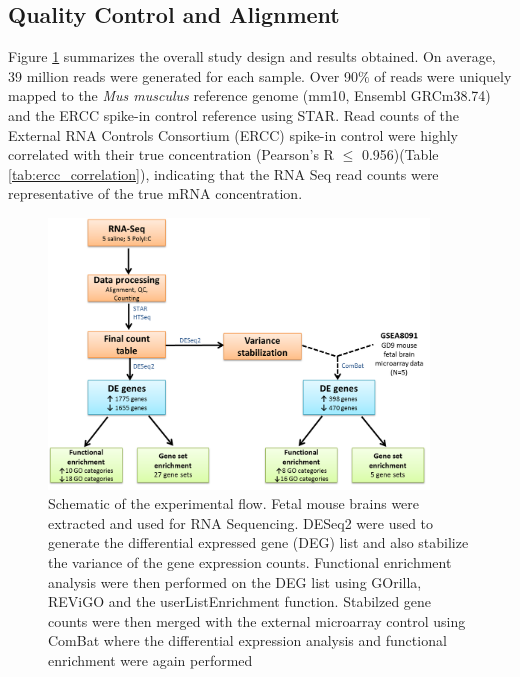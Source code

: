 \subsection{Quality Control and Alignment}
Figure \ref{fig:schematicMIA} summarizes the overall study design and results obtained.
On average, 39 million reads were generated for each sample. 
Over 90$\%$ of reads were uniquely mapped to the \textit{Mus musculus} reference genome (mm10, Ensembl GRCm38.74) and the ERCC spike-in control reference using STAR\cite{Dobin2013}. 
Read counts of the External RNA Controls Consortium (ERCC) spike-in control were highly correlated with their true concentration (Pearson’s R $\le$ 0.956)(Table \ref{tab:ercc_correlation}), indicating that the RNA Seq read counts were representative of the true mRNA concentration.
\begin{figure}[htbp]
	\centering
	\includegraphics[width=0.9\textwidth]{environmental_risk/image/er_flowchart.png}
	\caption[Schematic of the experimental flow]{Schematic of the experimental flow. 
		Fetal mouse brains were extracted and used for RNA Sequencing. 
		DESeq2 were used to generate the differential expressed gene (DEG) list and also stabilize the variance of the gene expression counts. 
		Functional enrichment analysis were then performed on the DEG list using GOrilla, REViGO and the userListEnrichment function. 
		Stabilzed gene counts were then merged with the external microarray control using ComBat where the differential expression analysis and functional enrichment were again performed}\label{fig:schematicMIA}
\end{figure}
